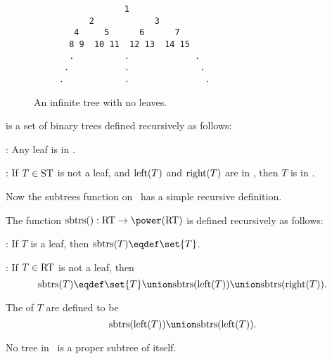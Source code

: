 \begin{figure}


\begin{verbatim}
                  1
           2            3
        4     5      6      7
       8 9  10 11  12 13  14 15
       .          .             . 
      .           .              .
     .            .               . 

\end{verbatim}

\caption{An infinite tree with no leaves.}

\label{inftree123}

\end{figure}

\iffalse
This abstract setup also allows some weird ``circular'' trees which
are proper subtrees of themselves.  Fortunately, all we need are the
recursively defined binary trees \rectree\ where all this weirdness
gets ruled out.
\fi

\begin{definition}
\rectree is a set of binary trees defined recursively as follows:

:  Any leaf is in \rectree.

: If $T \in \text{ST}$ is not a leaf,
and $\text{left}(T)$ and $\text{right}(T)$ are in \rectree, then $T$ is in
\rectree.
\end{definition}

Now the subtrees function on \rectree\ has a simple recursive
definition.

\begin{definition}
The function $\subtr{}: \rectree \to \power(\rectree)$ is defined recursively as follows:

: If $T$ is a leaf, then $\subtr{T} \eqdef
\set{T}$.

: If $T \in \text{RT}$ is not a leaf,
then
\[
\subtr{T} \eqdef \set{T} \union \subtr{\leftsub{T}} \union
\subtr{\rightsub{T}}.
\]

The  of $T$ are defined to be
\[
\subtr{\leftsub{T}} \union \subtr{\leftsub{T}}.
\]
\end{definition}

\begin{lemma}\label{}
No tree in \rectree\ is a proper subtree of itself.
\end{lemma}

